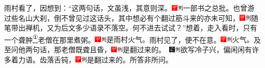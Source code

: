 {雨村看了，因想到：``这两句话，文虽浅，其意则深。{\includegraphics[width=3mm]{../Images/00002}\includegraphics[width=3mm]{../Images/00011}\footnotesize \kaishu 一部书之总批。}也曾游过些名山大刹，倒不曾见过这话头，其中想必有个翻过筋斗来的亦未可知，{\includegraphics[width=3mm]{../Images/00002}\includegraphics[width=3mm]{../Images/00011}\footnotesize \kaishu 随笔带出禅机，又为后文多少语录不落空。}何不进去试试？''想着，走入看时，只有一个聋肿\href{../Text/part0006_split_000.html\#lnkback_1_a}{\textsuperscript{①}}老僧在那里煮粥。{\includegraphics[width=3mm]{../Images/00002}\includegraphics[width=3mm]{../Images/00011}\footnotesize \kaishu 是雨村火气。}雨村见了，便不在意。{\includegraphics[width=3mm]{../Images/00002}\includegraphics[width=3mm]{../Images/00011}\footnotesize \kaishu 火气。}及至问他两句话，那老僧既聋且昏，{{\includegraphics[width=3mm]{../Images/00002}\includegraphics[width=3mm]{../Images/00011}\footnotesize \kaishu 是翻过来的。　}\includegraphics[width=3mm]{../Images/00006}\includegraphics[width=3mm]{../Images/00011}\footnotesize \kaishu 欲写冷子兴，偏闲闲有许多着力语。}齿落舌钝，{\includegraphics[width=3mm]{../Images/00002}\includegraphics[width=3mm]{../Images/00011}\footnotesize \kaishu 是翻过来的。}所答非所问。

}
